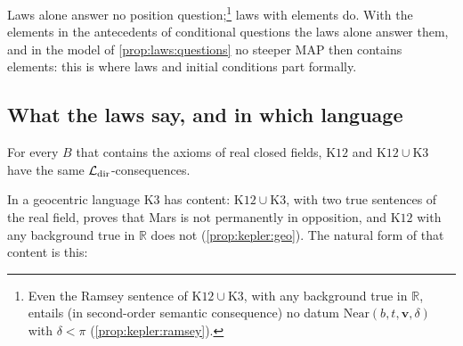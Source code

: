 Laws alone answer no position question;\footnote{Even the Ramsey sentence of $\mathrm{K12}\cup\mathrm{K3}$, with any background true in $\mathbb R$, entails (in second-order semantic consequence) no datum $\mathrm{Near}(b,t,\mathbf v,\delta)$ with $\delta<\pi$ (\cref{prop:kepler:ramsey}).} laws with elements do. With the elements in the antecedents of conditional questions the laws alone answer them, and in the model of \cref{prop:laws:questions} no steeper MAP then contains elements: this is where laws and initial conditions part formally.

\subsection{What the laws say, and in which language}\label{sec:kepler:content}

\begin{proposition}\label{prop:kepler:helio}
For every $B$ that contains the axioms of real closed fields, $\mathrm{K12}$ and $\mathrm{K12}\cup\mathrm{K3}$ have the same $\mathcal L_{\rm dir}$-consequences.
\end{proposition}

In a geocentric language $\mathrm{K3}$ has content: $\mathrm{K12}\cup\mathrm{K3}$, with two true sentences of the real field, proves that Mars is not permanently in opposition, and $\mathrm{K12}$ with any background true in $\mathbb R$ does not (\cref{prop:kepler:geo}). The natural form of that content is this:

